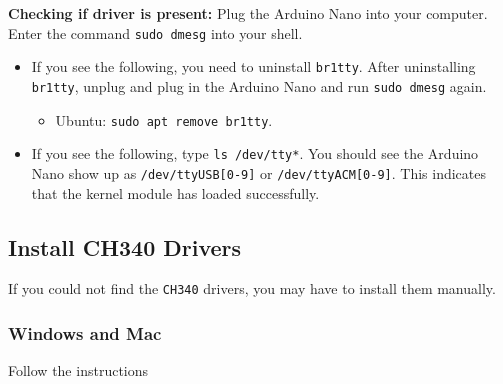 \documentclass{article}
\begin{document}
\vspace{1em}

{\bf Checking if driver is present: } Plug the Arduino Nano into your computer. Enter the command \verb|sudo dmesg| into your shell.

\begin{itemize}
    \item If you see the following, you need to uninstall \verb|br1tty|. After uninstalling \verb|br1tty|, unplug and plug in the Arduino Nano and run \verb|sudo dmesg| again.
    \begin{itemize}
        \item Ubuntu: \verb|sudo apt remove br1tty|.
    \end{itemize}
    \item If you see the following, type \verb|ls /dev/tty*|. You should see the Arduino Nano show up as \verb|/dev/ttyUSB[0-9]| or \verb|/dev/ttyACM[0-9]|. This indicates that the kernel module has loaded successfully.

\end{itemize}


\newpage

\subsection{Install CH340 Drivers}

If you could not find the \verb|CH340| drivers, you may have to install them manually.

\subsubsection{Windows and Mac}

Follow the instructions 
\end{document}
